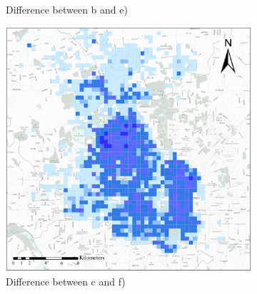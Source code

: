\documentclass[preprints,article,accept,moreauthors,pdftex]{Definitions/mdpi}
\begin{document}
\begin{figure}[ht]
\begin{subfigure}{.28\textwidth}
        \caption{Difference between b and e)}\label{fig:p_b_dif}
    \end{subfigure}
        \begin{subfigure}{.28\textwidth}
        \includegraphics[width=\textwidth]{Figures/BSSMinusmp3.eps}
        \caption{Difference between c and f)}\label{fig:p_c_dif}
    \end{subfigure}
    \begin{subfigure}{.14\textwidth}

\end{subfigure}
\end{figure}
\end{document}

